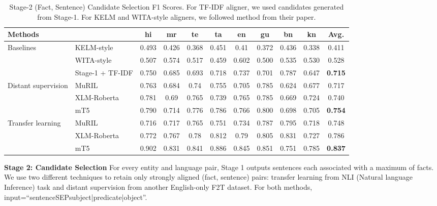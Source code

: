 \documentclass[11pt]{article}
\begin{document}
\begin{table*}
    \centering
    \scriptsize
    \begin{tabular}{|p{0.6in}|l|c|c|c|c|c|c|c|c||c|}
    \hline
    Methods&&hi&mr&te&ta&en&gu&bn&kn&Avg.\\
    \hline
    \hline
    \multirow{3}{0.6in}{Baselines}&KELM-style~\cite{agarwal2021knowledge}&0.493&0.426&0.368&0.451&0.41&0.372&0.436&0.338&0.411\\
    \cline{2-11}
    &WITA-style~\cite{fu2020partially}&0.507&0.574&0.517&0.459&0.602&0.500&0.535&0.530&0.528\\
    \cline{2-11}
    &Stage-1 + TF-IDF&0.750&0.685&0.693&0.718&0.737&0.701&0.787&0.647&\textbf{0.715}\\
    \hline
    \hline
    \multirow{3}{0.6in}{Distant supervision}&MuRIL~\cite{khanuja2021muril}&0.763&0.684&0.74&0.755&0.705&0.785&0.624&0.677&0.717 \\
    \cline{2-11}
    &XLM-Roberta~\cite{conneau2020unsupervised}&0.781&0.69&0.765&0.739&0.765&0.785&0.669&0.724&0.740 \\
    \cline{2-11}
    &mT5~\cite{xue2021mt5}&0.790&0.714&0.776&0.786&0.766&0.800&0.698&0.705&\textbf{0.754}\\
    \hline
    \hline
    \multirow{3}{0.6in}{Transfer learning}&MuRIL~\cite{khanuja2021muril}&0.716&0.717&0.765&0.751&0.734&0.787&0.795&0.718&0.748 \\
    \cline{2-11}
    &XLM-Roberta~\cite{conneau2020unsupervised}&0.772&0.767&0.78&0.812&0.79&0.805&0.831&0.727&0.786 \\
    \cline{2-11}
    &mT5~\cite{xue2021mt5}&0.902&0.831&0.841&0.886&0.845&0.851&0.751&0.785&\textbf{0.837} \\
    \hline
    \end{tabular}
    \caption{Stage-2 (Fact, Sentence) Candidate Selection F1 Scores. For TF-IDF aligner, we used candidates generated from Stage-1. For KELM and WITA-style aligners, we followed method from their paper.}
    \label{tab:stage2Results}
\end{table*}

\noindent\textbf{Stage 2: Candidate Selection}
For every entity and language pair, Stage 1 outputs sentences each associated with a maximum of  facts. We use two different techniques to retain only strongly aligned (fact, sentence) pairs: transfer learning from NLI (Natural language Inference) task and distant supervision from another English-only F2T dataset. For both methods, input=``sentenceSEPsubject|predicate|object''.
\end{document}
